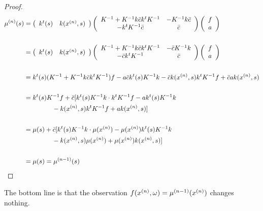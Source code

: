 \begin{proof}
\begin{align}
 \begin{split}
%
\mu^{(n)}(s) &= \left( \begin{array}{cc}
 k^t(s)  & k(\xn, s)  
\end{array} \right)
%
%
\left( \begin{array}{cc}
\kinv + \kinv k \bar{c} k^t \kinv  &  -\kinv k \bar{c} \\
-k^t\kinv \bar{c}   &  \bar{c}
 \end{array} \right)
%
%
\left( \begin{array}{cc}
 f  \\ a 
 \end{array} \right) \\\\
%
%
%
%
%
%
%
%
&= \left( \begin{array}{cc}
 k^t(s)  & k(\xn, s)
 \end{array} \right)
%
%
\left( \begin{array}{cc}
\kinv + \kinv k \bar{c} k^t \kinv  &  -\bar{c}\kinv k  \\
-\bar{c}k^t\kinv   & \bar{c}
 \end{array} \right)
%
%
\left( \begin{array}{cc}
 f  \\ a
  \end{array} \right) \\\\
%
%
&=  k^t(s)(\kinv + \kinv k \bar{c}k^t \kinv )f - a\bar{c} k^t(s) \kinv k  -\bar{c} k(\xn,s) k^t\kinv f + \bar{c}a k(\xn,s) \\\\
%
%
&=  k^t(s)\kinv f + \bar{c}[k^t(s)\kinv k\cdot  k^t \kinv f - a k^t(s) \kinv k \\
 &\ \ \ \ \ \ \ \ \ \ \ \ \ - k(\xn, s) k^t\kinv f + a k(\xn,s)] \\\\
%
%
%
&= \mu (s) + \bar{c}[k^t(s)\kinv k\cdot  \mu (\xn) -\mu(\xn) k^t(s) \kinv k \\
 &\ \ \ \ \ \ \ \ \ \ \ \ \ - k(\xn, s) \mu(\xn) + \mu(\xn) k(\xn,s)] \\\\
%
%
%
& = \mu(s) = \mu^{(n-1)} (s)
\end{split}
\end{align}
\end{proof}

The bottom line is that the observation $f( x^{(n)} ,\omega) = \mu^{(n-1)}(x^{(n)})$ changes nothing.




